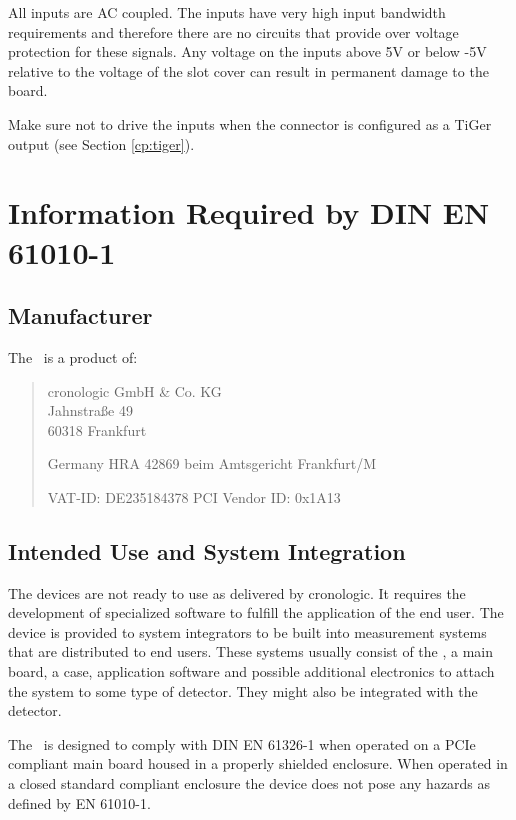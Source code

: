 	All inputs are AC coupled. The inputs have very high input bandwidth requirements and therefore there are no circuits that provide over voltage protection for these signals. 
	Any voltage on the inputs above 5V or below -5V relative to the voltage of the slot cover can result in permanent damage to the board.

	Make sure not to drive the inputs when the connector is configured as a TiGer output (see Section \ref{cp:tiger}). 

\newpage
\section{Information Required by DIN EN 61010-1}
\subsection{Manufacturer\label{cp:manu}}

The \deviceName\ is a product of:\

\begin{quote}
	cronologic GmbH \& Co. KG\\
	Jahnstra\ss{}e 49\\
	60318 Frankfurt\par
	Germany
	\noindent HRA 42869 beim Amtsgericht Frankfurt/M\par
	\noindent VAT-ID: DE235184378
	\noindent PCI Vendor ID: 0x1A13
\end{quote}

\subsection{Intended Use and System Integration}

	The devices are not ready to use as delivered by cronologic. It requires the development of specialized software to fulfill the application of the end user. The device is provided to system integrators to be built into measurement systems that are distributed to end users. These systems usually consist of the \deviceName, a main board, a case, application software and possible additional electronics to attach the system to some type of detector. They might also be integrated with the detector.\par

	The \deviceName\ is designed to comply with DIN EN 61326-1 when operated on a PCIe compliant main board housed in a properly shielded enclosure. 
	When operated in a closed standard compliant enclosure the device does not pose any hazards as defined by EN 61010-1.\par

